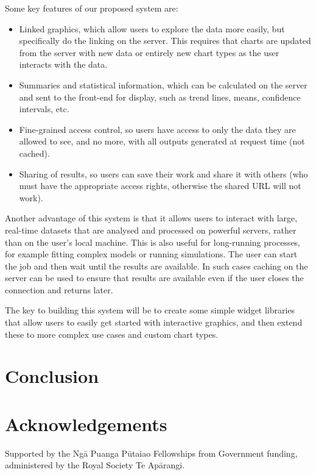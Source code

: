 \documentclass{article}
\begin{document}
Some key features of our proposed system are:
\begin{itemize}
\item Linked graphics, which allow users to explore the data more easily, but specifically do the linking on the server. This requires that charts are updated from the server with new data or entirely new chart types as the user interacts with the data.
\item Summaries and statistical information, which can be calculated on the server and sent to the front-end for display, such as trend lines, means, confidence intervals, etc.
\item Fine-grained access control, so users have access to only the data they are allowed to see, and no more, with all outputs generated at request time (not cached).
\item Sharing of results, so users can save their work and share it with others (who must have the appropriate access rights, otherwise the shared URL will not work).
\end{itemize}

Another advantage of this system is that it allows users to interact with large, real-time datasets that are analysed and processed on powerful servers, rather than on the user's local machine.
This is also useful for long-running processes, for example fitting complex models or running simulations.
The user can start the job and then wait until the results are available.
In such cases caching on the server can be used to ensure that results are available even if the user closes the connection and returns later.

The key to building this system will be to create some simple widget libraries that allow users to easily get started with interactive graphics, and then extend these to more complex use cases and custom chart types.


\section{Conclusion}
\label{sec:conclusion}




\section*{Acknowledgements}

Supported by the Ngā Puanga Pūtaiao Fellowships from Government funding, administered by the Royal Society Te Apārangi.

\printglossary[type=\acronymtype,nonumberlist,nopostdot]

\printbibliography
\end{document}
